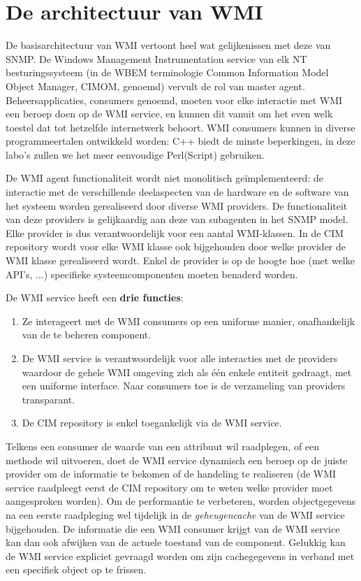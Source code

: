 \documentclass[11pt,a4paper]{report}
\begin{document}
\section{De architectuur van WMI}
De basisarchitectuur van WMI vertoont heel wat gelijkenissen met deze van SNMP. De Windows Management Instrumentation service van elk NT besturingssysteem (in de WBEM terminologie Common Information Model Object Manager, CIMOM, genoemd) vervult de rol van master agent. Beheersapplicaties, consumers genoemd, moeten voor elke interactie met WMI een beroep doen op de WMI service, en kunnen dit vanuit om het even welk toestel dat tot hetzelfde internetwerk behoort. WMI consumers kunnen in diverse programmeertalen ontwikkeld worden: C++ biedt de minste beperkingen, in deze labo's zullen we het meer eenvoudige Perl(Script) gebruiken.
\par De WMI agent functionaliteit wordt niet monolitisch geïmplementeerd: de interactie met de verschillende deelaspecten van de hardware en de software van het systeem worden gerealiseerd door diverse WMI providers. De functionaliteit van deze providers is gelijkaardig aan deze van subagenten in het SNMP model. Elke provider is dus verantwoordelijk voor een aantal WMI-klassen. In de CIM repository wordt voor elke WMI klasse ook bijgehouden door welke provider de WMI klasse gerealiseerd wordt. Enkel de provider is op de hoogte hoe (met welke API's, ...) specifieke systeemcomponenten moeten benaderd worden.
\par De WMI service heeft een \textbf{drie functies}:
\begin{enumerate}
	\item Ze interageert met de WMI consumers op een uniforme manier, onafhankelijk van de te beheren component.
	\item De WMI service is verantwoordelijk voor alle interacties met de providers waardoor de gehele WMI omgeving zich als één enkele entiteit gedraagt, met een uniforme interface. Naar consumers toe is de verzameling van providers transparant.
	\item De CIM repository is enkel toegankelijk via de WMI service.
\end{enumerate}
\par Telkens een consumer de waarde van een attribuut wil raadplegen, of een methode wil uitvoeren, doet de WMI service dynamisch een beroep op de juiste provider om de informatie te bekomen of de handeling te realiseren (de WMI service raadpleegt eerst de CIM repository om te weten welke provider moet aangesproken worden). Om de performantie te verbeteren, worden objectgegevens na een eerste raadpleging wel tijdelijk in de \textit{geheugencache} van de WMI service bijgehouden. De informatie die een WMI consumer krijgt van de WMI service kan dan ook afwijken van de actuele toestand van de component. Gelukkig kan de WMI service expliciet gevraagd worden om zijn cachegegevens in verband met een specifiek object op te frissen.
\end{document}

